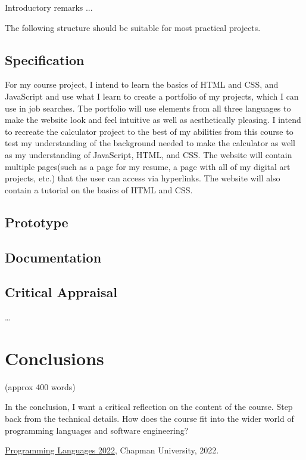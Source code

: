 \documentclass{article}
\theoremstyle{theorem}
\theoremstyle{definition}
\theoremstyle{remark}
\begin{document}
Introductory remarks ...

The following structure should be suitable for most practical projects. 

\subsection{Specification}

For my course project, I intend to learn the basics of HTML and CSS, and JavaScript and use what I learn to create a portfolio of my projects, which I can use in job searches. The portfolio will use elements from all three languages to make the website look and feel intuitive as well as aesthetically pleasing. I intend to recreate the calculator project to the best of my abilities from this course to test my understanding of the background needed to make the calculator as well as my understanding of JavaScript, HTML, and CSS. The website will contain multiple pages(such as a page for my resume, a page with all of my digital art projects, etc.) that the user can access via hyperlinks. The website will also contain a tutorial on the basics of HTML and CSS.

\subsection{Prototype}
\subsection{Documentation}
\subsection{Critical Appraisal}

\ldots

\section{Conclusions}\label{conclusions}

(approx 400 words)

In the conclusion, I want a critical reflection on the content of the course. Step back from the technical details. How does the course fit into the wider world of programming languages and software engineering?

\begin{thebibliography}{99}
 \href{https://github.com/alexhkurz/programming-languages-2022/blob/main/README.md}{Programming Languages 2022}, Chapman University, 2022.
\end{thebibliography}
\end{document}
